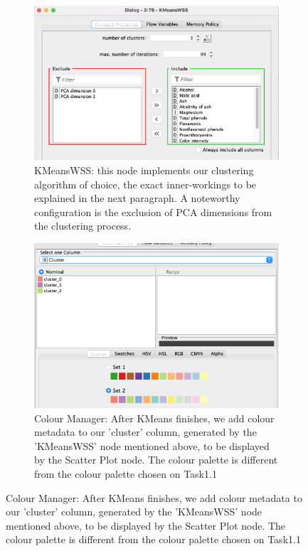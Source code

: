 \documentclass[11pt]{article}
\begin{document}
			\iffalse
			\begin{figure}[H]
				\centering
				\begin{subfigure}{0.4\textwidth}
					\includegraphics[width=\textwidth]{res/t1/t12/t12-kmeans-wss-conf}
					\caption{KMeansWSS: this node implements our clustering algorithm of choice, the exact inner-workings to be explained in the next paragraph. A noteworthy configuration is the exclusion of PCA dimensions from the clustering process.}
					\label{fig:first}
				\end{subfigure}
				\hfill
				\begin{subfigure}{0.4\textwidth}
					\includegraphics[width=\textwidth]{res/t1/t12/t12-color-manager-conf}
					\caption{Colour Manager: After KMeans finishes, we add colour metadata to our 'cluster' column, generated by the 'KMeansWSS' node mentioned above, to be displayed by the Scatter Plot node. The colour palette is different from the colour palette chosen on Task1.1}
					\label{fig:second}
				\end{subfigure}
				\hfill
			\end{figure}
\end{document}
